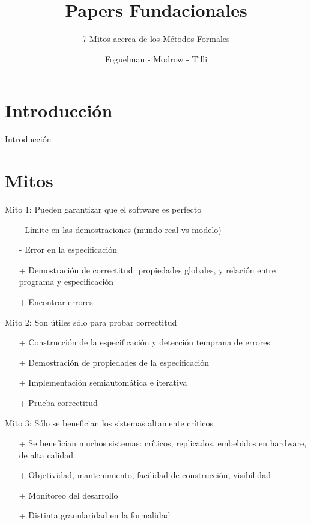 \documentclass{beamer}
\title{Papers Fundacionales}
\subtitle{7 Mitos acerca de los M\'etodos Formales}
\author{Foguelman - Modrow - Tilli}
\institute{DC - UBA}
\begin{document}
\frame{\titlepage}
\section{Introducci\'on}
\begin{frame}{Introducci\'on}

\end{frame}

\section{Mitos}
\begin{frame}{Mito 1: Pueden garantizar que el software es perfecto }
\begin{itemize}[<+->]
\item[-] L\'imite en las demostraciones (mundo real vs modelo)
\item[-] Error en la especificaci\'on
\item[+] Demostraci\'on de correctitud: propiedades globales, y relaci\'on entre programa y especificaci\'on
\item[+] Encontrar errores
\end{itemize}
\end{frame}

\begin{frame}{Mito 2: Son \'utiles s\'olo para probar correctitud}
\begin{itemize}[<+->]
\item[+] Construcci\'on de la especificaci\'on y detecci\'on temprana de errores
\item[+] Demostraci\'on de propiedades de la especificaci\'on
\item[+] Implementaci\'on semiautom\'atica e iterativa
\item[+] Prueba correctitud
\end{itemize}
\end{frame}
 
\begin{frame}{Mito 3: S\'olo se benefician los sistemas altamente cr\'iticos}
\begin{itemize}[<+->]
\item[+] Se benefician muchos sistemas: cr\'iticos, replicados, embebidos en hardware, de alta calidad
\item[+] Objetividad, mantenimiento, facilidad de construcci\'on, visibilidad 
\item[+] Monitoreo del desarrollo
\item[+] Distinta granularidad en la formalidad
\end{itemize}
\end{frame}
 
\end{document}
